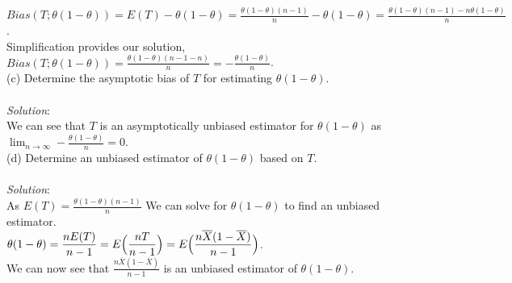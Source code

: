 \documentclass[12pt]{article}
\newcommand{\XB}{\color{black}}
\newcommand{\XBB}{\color{blue}}
\begin{document}
\noindent
$ \displaystyle Bias(T; \theta(1 - \theta)) = E(T) - \theta(1 - \theta) = \frac{\theta(1 - \theta)(n - 1)}{n} - \theta(1 - \theta) = \frac{\theta(1 - \theta)(n - 1) - n\theta(1 - \theta)}{n} $. \\

\noindent
Simplification provides our solution, $ \displaystyle Bias(T; \theta(1 - \theta)) = \frac{\theta(1 - \theta)(n - 1 - n)}{n} = -\frac{\theta(1 - \theta)}{n} $. \\


(c) Determine the asymptotic bias of $ T $ for estimating $ \theta(1 - \theta) $. \\
\vspace{2.5mm} \\
\textit{Solution}:
\vspace{2.5mm} \\

\noindent
We can see that $ T $ is an asymptotically unbiased estimator for $ \theta(1 - \theta) $ as $ \displaystyle \lim_{n \to \infty} -\frac{\theta(1 - \theta)}{n} = 0 $. \\


(d) Determine an unbiased estimator of $ \theta(1 - \theta) $ based on $ T $. \\
\vspace{2.5mm} \\
\textit{Solution}:
\vspace{2.5mm} \\

\noindent
As $ \displaystyle E(T) = \frac{\theta(1 - \theta)(n - 1)}{n} $ We can solve for $ \theta(1 - \theta) $ to find an unbiased estimator. \\

$ \displaystyle \theta(1 - \theta) = \frac{nE(T)}{n - 1} = E\Bigl( \frac{nT}{n - 1} \Bigr) = E\Bigl( \frac{n\overline{X}(1 - \overline{X})}{n - 1} \Bigr) $. \\

\noindent
We can now see that $ \displaystyle \frac{n\overline{X}(1 - \overline{X})}{n - 1} $ is an unbiased estimator of $ \theta(1 - \theta) $. \\

\newpage
\XBB\hrulefill\XB \\
\end{document}
